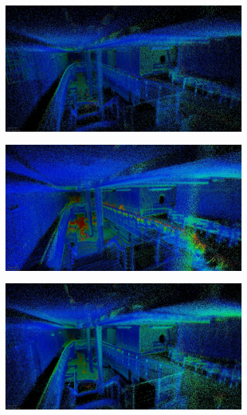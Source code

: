 \documentclass[a4paper, conference]{IEEEtran}
\begin{document}
\begin{figure}
\centering
\begin{subfigure}{0.195\textwidth}
    \centering
    \includegraphics[width=\textwidth]{pics/results_images/non_lio.jpg}
    \label{fig:results_non_lio}
\end{subfigure}
\begin{subfigure}{0.195\textwidth}
    \centering
    \includegraphics[width=\textwidth]{pics/results_images/non_livo.jpg}
    \label{fig:results_non_livo}
\end{subfigure}
\begin{subfigure}{0.195\textwidth}
    \centering
    \includegraphics[width=\textwidth]{pics/results_images/a_lio.jpg}

\end{subfigure}
\end{figure}
\end{document}
